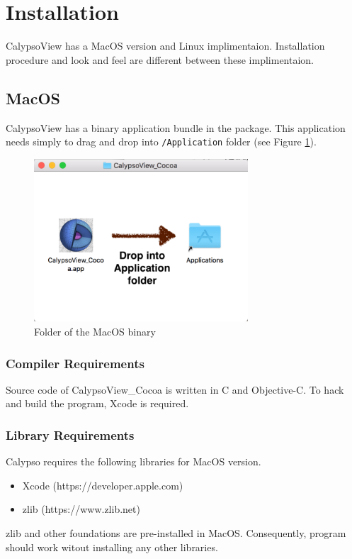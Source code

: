 \newpage
\section{Installation}
CalypsoView has a MacOS version and Linux implimentaion. Installation procedure and look and feel are different between these implimentaion.

\subsection{MacOS}
CalypsoView has a binary application bundle in the package. This application needs simply to drag and drop into  
\verb|/Application| folder (see Figure \ref{fig:mac_install}).
%
\begin{figure}[htbp]
\begin{center}
\includegraphics*[width=80mm]{Images/install_mac}
\end{center}
\caption{Folder of the MacOS binary}
\label{fig:mac_install}
\end{figure}
%

\subsubsection{Compiler Requirements}
Source code of CalypsoView\_Cocoa is written in C and Objective-C. To hack and build the program, Xcode is required.

\subsubsection{Library Requirements}
\label{sec:requirements_mac}
Calypso requires the following libraries for MacOS version.
\begin{itemize}
\item Xcode (https://developer.apple.com)
\item zlib (https://www.zlib.net)
\end{itemize}
zlib and other foundations are pre-installed in MacOS. Consequently, program should work witout installing any other libraries.

